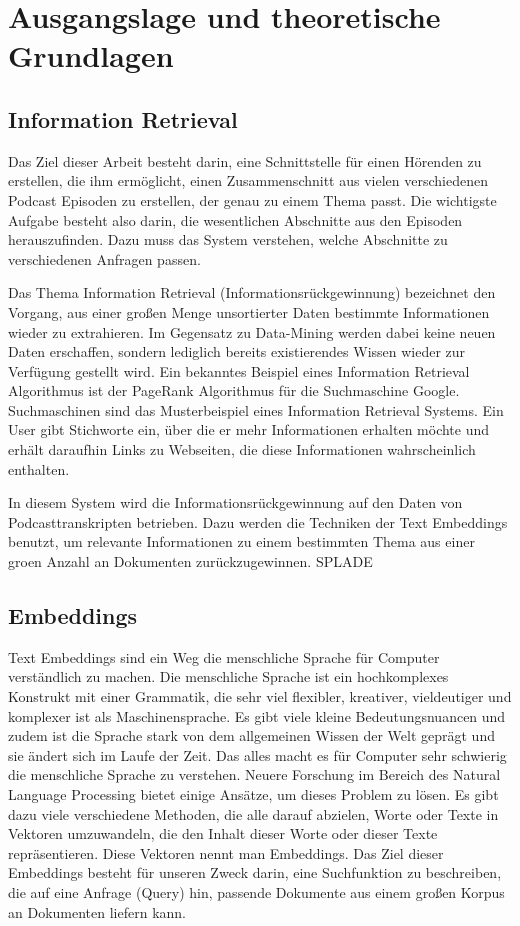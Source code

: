 \chapter{Ausgangslage und theoretische Grundlagen}\label{ch:theoretical}


\section{Information Retrieval}

Das Ziel dieser Arbeit besteht darin, eine Schnittstelle für einen Hörenden zu erstellen, die ihm ermöglicht, einen Zusammenschnitt aus vielen verschiedenen Podcast Episoden zu erstellen, der genau zu einem Thema passt. 
Die wichtigste Aufgabe besteht also darin, die wesentlichen Abschnitte aus den Episoden herauszufinden. 
Dazu muss das System verstehen, welche Abschnitte zu verschiedenen Anfragen passen. 

Das Thema Information Retrieval (Informationsrückgewinnung) bezeichnet den Vorgang, aus einer großen Menge unsortierter Daten bestimmte Informationen wieder zu extrahieren.
Im Gegensatz zu Data-Mining werden dabei keine neuen Daten erschaffen, sondern lediglich bereits existierendes Wissen wieder zur Verfügung gestellt wird.
Ein bekanntes Beispiel eines Information Retrieval Algorithmus ist der PageRank Algorithmus für die Suchmaschine Google.
Suchmaschinen sind das Musterbeispiel eines Information Retrieval Systems.
Ein User gibt Stichworte ein, über die er mehr Informationen erhalten möchte und erhält daraufhin Links zu Webseiten, die diese Informationen wahrscheinlich enthalten.

In diesem System wird die Informationsrückgewinnung auf den Daten von Podcasttranskripten betrieben.
Dazu werden die Techniken der Text Embeddings benutzt, um relevante Informationen zu einem bestimmten Thema aus einer groen Anzahl an Dokumenten zurückzugewinnen.
SPLADE

\section{Embeddings}

Text Embeddings sind ein Weg die menschliche Sprache für Computer verständlich zu machen. 
Die menschliche Sprache ist ein hochkomplexes Konstrukt mit einer Grammatik, die sehr viel flexibler, kreativer, vieldeutiger und komplexer ist als Maschinensprache. 
Es gibt viele kleine Bedeutungsnuancen und zudem ist die Sprache stark von dem allgemeinen Wissen der Welt geprägt und sie ändert sich im Laufe der Zeit. 
Das alles macht es für Computer sehr schwierig die menschliche Sprache zu verstehen. 
Neuere Forschung im Bereich des Natural Language Processing bietet einige Ansätze, um dieses Problem zu lösen. 
Es gibt dazu viele verschiedene Methoden, die alle darauf abzielen, Worte oder Texte in Vektoren umzuwandeln, die den Inhalt dieser Worte oder dieser Texte repräsentieren.
Diese Vektoren nennt man Embeddings.
Das Ziel dieser Embeddings besteht für unseren Zweck darin, eine Suchfunktion zu beschreiben, die auf eine Anfrage (Query) hin, passende Dokumente aus einem großen Korpus an Dokumenten liefern kann.


